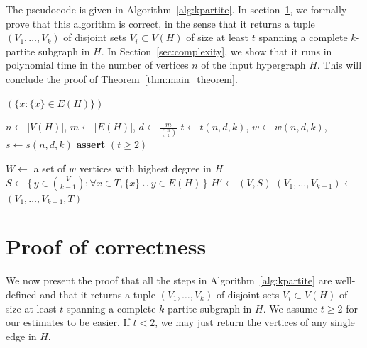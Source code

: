 \documentclass{amsart}
\begin{document}
The pseudocode is given in Algorithm~\ref{alg:kpartite}.
In section~\ref{sec:correctness}, we formally prove that this algorithm is correct,
in the sense that it returns a tuple $(V_1, \dots, V_k)$ of disjoint sets $V_i \subset V(H)$
of size at least $t$ spanning a complete $k$-partite subgraph in $H$.
In Section~\ref{sec:complexity}, we
show that it runs in polynomial time in the number of vertices $n$ of the input hypergraph $H$.
This will conclude the proof of Theorem~\ref{thm:main_theorem}.

\begin{algorithm}[H]
    \caption{Finding a balanced $k$-partite $k$-uniform subgraph}
    \label{alg:kpartite}
    \begin{algorithmic}[1]
                \State \Return $(\{x \colon \{x\} \in E(H)\})$
            \EndIf

            \State $n \gets |V(H)|$, $m \gets |E(H)|$, $d \gets \frac{m}{\binom{n}{k}}$
            \State $t \gets t(n, d, k)$, $w \gets w(n, d, k)$, $s \gets s(n, d, k)$
            \State \textbf{assert} $(t \ge 2)$

            \State $W \gets$ a set of $w$ vertices with highest degree in $H$
                \State $S \gets \{\,y \in \binom{V}{k-1} \colon \forall x \in T, \{x\} \cup y \in E(H)\,\}$
                    \State $H' \gets (V, S)$  
                    \State $(V_1, \dots, V_{k-1}) \gets$  \label{recurse}
                    \State \Return $(V_1, \dots, V_{k-1}, T)$
                \EndIf
            \EndFor
        \EndFunction
    \end{algorithmic}
\end{algorithm}

\section{Proof of correctness}\label{sec:correctness}

We now present the proof that
all the steps in Algorithm~\ref{alg:kpartite} are well-defined and that
it returns a tuple $(V_1, \dots, V_k)$ of disjoint sets $V_i \subset V(H)$
of size at least $t$ spanning a complete $k$-partite subgraph in $H$.
We assume $t \ge 2$ for our estimates to be easier.
If $t < 2$, we may just return the vertices of any single edge in $H$.
\end{document}
